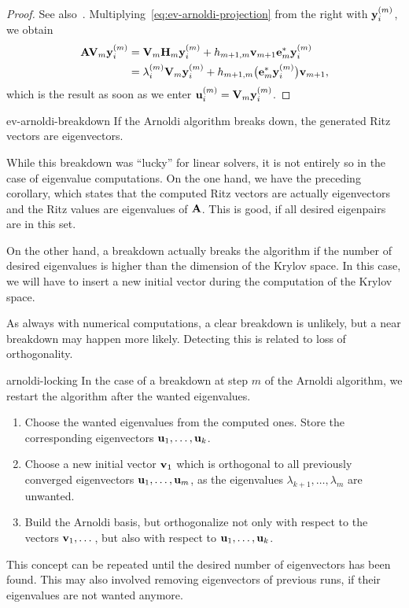 \begin{proof}
  See also~\cite[Proposition 6.8]{Saad11}.
  Multiplying~\eqref{eq:ev-arnoldi-projection} from the
  right with $\mathbf y_i^{(m)}$, we obtain
  \begin{align}
    \mathbf A\mathbf V_m\mathbf y_i^{(m)}
    &= \mathbf V_m\mathbf H_m\mathbf y_i^{(m)} + h_{m+1,m}\mathbf v_{m+1}\mathbf e_m^*\mathbf y_i^{(m)}\\
    &=\lambda_i^{(m)} \mathbf V_m\mathbf y_i^{(m)}
      + h_{m+1,m}\bigl(\mathbf e_m^*\mathbf y_i^{(m)}\bigr)\mathbf v_{m+1},
  \end{align}
  which is the result as soon as we enter $\mathbf u_i^{(m)} = \mathbf V_m \mathbf y_i^{(m)}$.
\end{proof}

\begin{Corollary}{ev-arnoldi-breakdown}
  If the Arnoldi algorithm breaks down, the generated Ritz vectors are
  eigenvectors.
\end{Corollary}

\begin{remark}
  While this breakdown was ``lucky'' for linear solvers, it is not
  entirely so in the case of eigenvalue computations. On the one hand,
  we have the preceding corollary, which states that the computed Ritz
  vectors are actually eigenvectors and the Ritz values are
  eigenvalues of $\mathbf A$. This is good, if all desired eigenpairs are
  in this set.

  On the other hand, a breakdown actually
  breaks the algorithm if the number of desired eigenvalues is higher
  than the dimension of the Krylov space. In this case, we will have
  to insert a new initial vector during the computation of the Krylov
  space.

  As always with numerical computations, a clear breakdown is
  unlikely, but a near breakdown may happen more likely. Detecting
  this is related to loss of orthogonality.
\end{remark}

\begin{Definition}{arnoldi-locking}
  In the case of a breakdown at step $m$ of the Arnoldi algorithm,
  we restart the algorithm after  the wanted eigenvalues.

  \begin{enumerate}
  \item Choose the wanted eigenvalues from the computed ones. Store
    the corresponding eigenvectors $\mathbf u_1,\dots,\mathbf u_k$.
  \item Choose a new initial vector $\mathbf v_1$ which is orthogonal to all
    previously converged eigenvectors $\mathbf u_1,\dots,\mathbf u_m$, as the
    eigenvalues $\lambda_{k+1},\dots,\lambda_m$ are unwanted.
  \item Build the Arnoldi basis, but orthogonalize not only with
    respect to the vectors $\mathbf v_1,\dots$, but also with respect to
    $\mathbf u_1,\dots,\mathbf u_k$.
  \end{enumerate}
  This concept can be repeated until the desired number of
  eigenvectors has been found. This may also involved removing
  eigenvectors of previous runs, if their eigenvalues are not wanted
  anymore.
\end{Definition}

